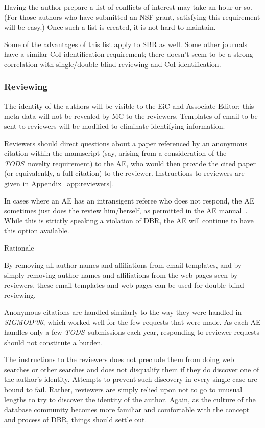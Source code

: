 \documentclass[acmtods,acmnow]{acmtrans2m}
\newcommand{\tods}{{\em TODS\/}}
\begin{document}
Having the author prepare a list of conflicts of interest may take an hour
or so. (For those authors who have submitted an NSF grant, satisfying this
requirement will be easy.) Once such a list is created, it is not hard
to maintain.

Some of the advantages of this list apply to SBR as well. Some other
journals have a similar CoI identification requirement; there doesn't seem
to be a strong correlation with single/double-blind reviewing and CoI
identification. 

\subsubsection{Reviewing}
The identity of the
authors will be visible to the EiC and Associate Editor; this meta-data will
not be revealed by MC to the reviewers. Templates of
email to be sent to reviewers will be modified to eliminate identifying
information.

Reviewers should direct questions about a paper referenced by an anonymous
citation within the manuscript (say, arising from a consideration of the
\tods\ novelty requirement) to the AE, who would then
provide the cited paper (or equivalently, a full citation) to the
reviewer.
Instructions to reviewers are given in Appendix~\ref{app:reviewers}.

In cases where an AE has an intransigent referee who does not respond, the AE
sometimes just does the review him/herself, as permitted
in the AE manual~\cite{AEmanual}. While this is strictly speaking a
violation of DBR, the AE will continue to have this option available.

\noindent
{\sffamily Rationale}

By removing all author names and affiliations from email templates, 
and by simply removing author names and affiliations from the web
pages seen by reviewers, these email templates and web pages can be used for
double-blind reviewing.

Anonymous citations are handled similarly to the way they were handled in {\em
SIGMOD'06}, which worked well for the few requests that were made. As each
AE handles only a few \tods\ submissions each year,
responding to reviewer requests should not constitute a burden.

The instructions to the reviewers does not preclude them from doing web
searches or other searches and does not disqualify them if they do discover
one of the author's identity. Attempts to prevent such discovery in every
single case are bound to fail. Rather, reviewers are simply relied upon not
to go to unusual lengths to try to discover the identity of the
author. Again, as the culture of the database community becomes more
familiar and comfortable with the concept and process of DBR, things should
settle out.
\end{document}
